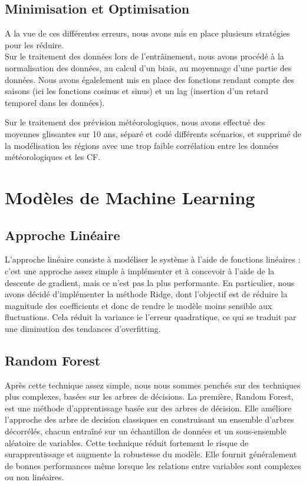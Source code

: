 \documentclass{article}
\theoremstyle{nopointbreak}
\theoremstyle{nobrkbold}
\begin{document}
\subsection{Minimisation et Optimisation}
A la vue de ces différentes erreurs, nous avons mis en place plusieurs stratégies pour les réduire. \\


Sur le traitement des données lors de l'entrâinement, nous avons procédé à la normalisation des données, au calcul d'un biais, au moyennage d'une partie des données. Nous avons égalelement mis en place des fonctions rendant compte des saisons (ici les fonctions cosinus et sinus) et un lag (insertion d'un retard temporel dans les données). 

Sur le traitement des prévision météorologiques, nous avons effectué des moyennes glissantes sur 10 ans, séparé et codé différents scénarios, et supprimé de la modélisation les régions avec une trop faible corrélation entre les données météorologiques et les CF. \\

\section{Modèles de Machine Learning}


\subsection{Approche Linéaire }

L'approche linéaire consiste à modéliser le système à l'aide de fonctions linéaires : c'est une approche assez simple à implémenter et à concevoir à l'aide de la descente de gradient, mais ce n'est pas la plus performante.  
En particulier, nous avons décidé d'implémenter la méthode Ridge,
 dont l'objectif est de réduire la magnitude des coefficients et donc de rendre le modèle moins sensible aux fluctuations. Cela réduit la variance ie l'erreur quadratique, ce qui se traduit par une diminution des tendances d'overfitting. 


\subsection{Random Forest}

Après cette technique assez simple, nous nous sommes penchés sur des techniques plus complexes, basées sur les arbres de décisions.
La première, Random Forest, est une méthode d’apprentissage basée sur des arbres de décision. Elle améliore l’approche des arbre de decision classiques en construisant un ensemble d’arbres décorrélés, chacun entraîné sur un échantillon de données et un sous-ensemble aléatoire de variables. Cette technique réduit fortement le risque de surapprentissage et augmente la robustesse du modèle. Elle fournit généralement de bonnes performances même lorsque les relations entre variables sont complexes ou non linéaires.
\end{document}
